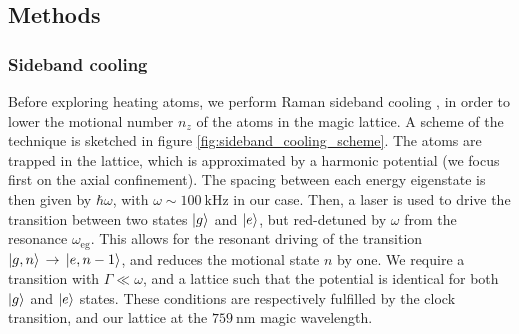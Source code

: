 \documentclass[11pt]{article}
\numberwithin{equation}{section}
\numberwithin{figure}{section}
\begin{document}
\subsection{Methods}
\label{sec:methods}

\subsubsection{Sideband cooling}
\label{sec:sideband_cooling}

Before exploring heating atoms, we perform Raman sideband cooling \citep[first experimented by][]{1989_diedrich}, in order to lower the motional number $n_z$ of the atoms in the magic lattice. A scheme of the technique is sketched in figure \ref{fig:sideband_cooling_scheme}. The atoms are trapped in the lattice, which is approximated by a harmonic potential (we focus first on the axial confinement). The spacing between each energy eigenstate is then given by $\hbar \omega$, with $\omega \sim \SI{100}{\kilo\hertz}$ in our case. Then, a laser is used to drive the transition between two states $\ket{g}$ and $\ket{e}$, but red-detuned by $\omega$ from the resonance $\omega_\text{eg}$. This allows for the resonant driving of the transition $\ket{g, n} \, \rightarrow \, \ket{e, n-1}$, and reduces the motional state $n$ by one. We require a transition with $\Gamma \ll \omega$, and a lattice such that the potential is identical for both $\ket{g}$ and $\ket{e}$ states. These conditions are respectively fulfilled by the clock transition, and our lattice at the $\SI{759}{\nano\metre}$ magic wavelength. 
\end{document}
